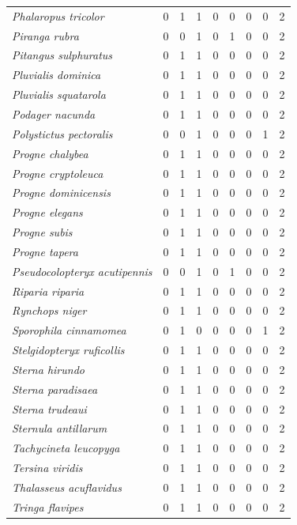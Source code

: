 \documentclass[
  oneside]{scrbook}
\begin{document}
\begin{ThreePartTable}
\begin{longtable}[t]{>{}lrrrrrlrl}
\em{Phalaropus tricolor} & 0 & 1 & 1 & 0 & 0 & 0 & 0 & 2\\
\em{Piranga rubra} & 0 & 0 & 1 & 0 & 1 & 0 & 0 & 2\\
\em{Pitangus sulphuratus} & 0 & 1 & 1 & 0 & 0 & 0 & 0 & 2\\
\em{Pluvialis dominica} & 0 & 1 & 1 & 0 & 0 & 0 & 0 & 2\\
\addlinespace
\em{Pluvialis squatarola} & 0 & 1 & 1 & 0 & 0 & 0 & 0 & 2\\
\em{Podager nacunda} & 0 & 1 & 1 & 0 & 0 & 0 & 0 & 2\\
\em{Polystictus pectoralis} & 0 & 0 & 1 & 0 & 0 & 0 & 1 & 2\\
\em{Progne chalybea} & 0 & 1 & 1 & 0 & 0 & 0 & 0 & 2\\
\em{Progne cryptoleuca} & 0 & 1 & 1 & 0 & 0 & 0 & 0 & 2\\
\addlinespace
\em{Progne dominicensis} & 0 & 1 & 1 & 0 & 0 & 0 & 0 & 2\\
\em{Progne elegans} & 0 & 1 & 1 & 0 & 0 & 0 & 0 & 2\\
\em{Progne subis} & 0 & 1 & 1 & 0 & 0 & 0 & 0 & 2\\
\em{Progne tapera} & 0 & 1 & 1 & 0 & 0 & 0 & 0 & 2\\
\em{Pseudocolopteryx acutipennis} & 0 & 0 & 1 & 0 & 1 & 0 & 0 & 2\\
\addlinespace
\em{Riparia riparia} & 0 & 1 & 1 & 0 & 0 & 0 & 0 & 2\\
\em{Rynchops niger} & 0 & 1 & 1 & 0 & 0 & 0 & 0 & 2\\
\em{Sporophila cinnamomea} & 0 & 1 & 0 & 0 & 0 & 0 & 1 & 2\\
\em{Stelgidopteryx ruficollis} & 0 & 1 & 1 & 0 & 0 & 0 & 0 & 2\\
\em{Sterna hirundo} & 0 & 1 & 1 & 0 & 0 & 0 & 0 & 2\\
\addlinespace
\em{Sterna paradisaea} & 0 & 1 & 1 & 0 & 0 & 0 & 0 & 2\\
\em{Sterna trudeaui} & 0 & 1 & 1 & 0 & 0 & 0 & 0 & 2\\
\em{Sternula antillarum} & 0 & 1 & 1 & 0 & 0 & 0 & 0 & 2\\
\em{Tachycineta leucopyga} & 0 & 1 & 1 & 0 & 0 & 0 & 0 & 2\\
\em{Tersina viridis} & 0 & 1 & 1 & 0 & 0 & 0 & 0 & 2\\
\addlinespace
\em{Thalasseus acuflavidus} & 0 & 1 & 1 & 0 & 0 & 0 & 0 & 2\\
\em{Tringa flavipes} & 0 & 1 & 1 & 0 & 0 & 0 & 0 & 2\\

\end{longtable}
\end{ThreePartTable}
\end{document}
